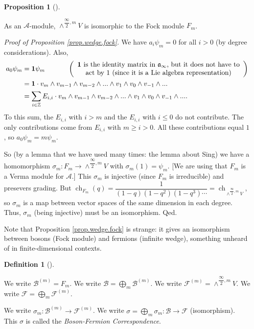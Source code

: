 \documentclass
[numbers=enddot,12pt,final,onecolumn,german,notitlepage]{scrartcl}%
\theoremstyle{definition}
\newtheorem{prop}[theo]{Proposition}
\newenvironment{proposition}[1][]
{\begin{prop}[#1]\begin{leftbar}}
{\end{leftbar}\end{prop}}
\newtheorem{defi}[theo]{Definition}
\newenvironment{definition}[1][]
{\begin{defi}[#1]\begin{leftbar}}
{\end{leftbar}\end{defi}}
\begin{document}
\begin{proposition}
\label{prop.wedge.fock}As an $\mathcal{A}$-module, $\wedge^{\dfrac{\infty}%
{2},m}V$ is isomorphic to the Fock module $F_{m}$.
\end{proposition}

\textit{Proof of Proposition \ref{prop.wedge.fock}.} We have $a_{i}\psi_{m}=0$
for all $i>0$ (by degree considerations). Also,%
\begin{align*}
a_{0}\psi_{m}  &  =\mathbf{1}\psi_{m}\ \ \ \ \ \ \ \ \ \ \left(
\begin{array}
[c]{c}%
\mathbf{1}\text{ is the identity matrix in }\mathfrak{a}_{\infty}\text{, but
it does not have to}\\
\text{act by }1\text{ (since it is a Lie algebra representation)}%
\end{array}
\right) \\
&  =\mathbf{1}\cdot v_{m}\wedge v_{m-1}\wedge v_{m-2}\wedge...\wedge
v_{1}\wedge v_{0}\wedge v_{-1}\wedge...\\
&  =\sum\limits_{i\in\mathbb{Z}}E_{i,i}\cdot v_{m}\wedge v_{m-1}\wedge
v_{m-2}\wedge...\wedge v_{1}\wedge v_{0}\wedge v_{-1}\wedge....
\end{align*}
To this sum, the $E_{i,i}$ with $i>m$ and the $E_{i,i}$ with $i\leq0$ do not
contribute. The only contributions come from $E_{i,i}$ with $m\geq i>0$. All
these contributions equal $1$, so $a_{0}\psi_{m}=m\psi_{m}$.

So (by a lemma that we have used many times: the lemma about Sing) we have a
homomorphism $\sigma_{m}:F_{m}\rightarrow\wedge^{\dfrac{\infty}{2},m}V$ with
$\sigma_{m}\left(  1\right)  =\psi_{m}$. [We are using that $F_{m}$ is a Verma
module for $\mathcal{A}$.] This $\sigma_{m}$ is injective (since $F_{m}$ is
irreducible) and presevers grading. But $\operatorname*{ch}\nolimits_{F_{m}%
}\left(  q\right)  =\dfrac{1}{\left(  1-q\right)  \left(  1-q^{2}\right)
\left(  1-q^{3}\right)  \cdots}=\operatorname*{ch}\nolimits_{\wedge
^{\dfrac{\infty}{2},m}V}$, so $\sigma_{m}$ is a map between vector spaces of
the same dimension in each degree. Thus, $\sigma_{m}$ (being injective) must
be an isomorphism. Qed.

Note that Proposition \ref{prop.wedge.fock} is strange: it gives an
isomorphism between bosons (Fock module) and fermions (infinite wedge),
something unheard of in finite-dimensional contexts.

\begin{definition}
We write $\mathcal{B}^{\left(  m\right)  }=F_{m}$. We write $\mathcal{B}%
=\bigoplus\limits_{m}\mathcal{B}^{\left(  m\right)  }$. We write
$\mathcal{F}^{\left(  m\right)  }=\wedge^{\dfrac{\infty}{2},m}V$. We write
$\mathcal{F}=\bigoplus\limits_{m}\mathcal{F}^{\left(  m\right)  }$.

We write $\sigma_{m}:\mathcal{B}^{\left(  m\right)  }\rightarrow
\mathcal{F}^{\left(  m\right)  }$. We write $\sigma=\bigoplus\limits_{m}%
\mathcal{\sigma}_{m}:\mathcal{B}\rightarrow\mathcal{F}$ (isomorphism). This
$\sigma$ is called the \textit{Boson-Fermion Correspondence}.
\end{definition}
\end{document}
